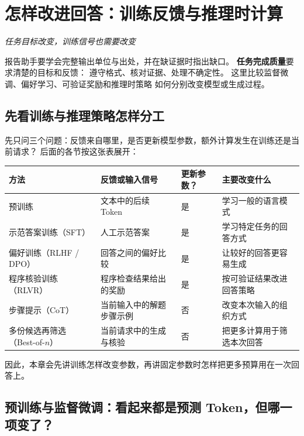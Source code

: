 \chapterrule
\section{怎样改进回答：训练反馈与推理时计算}
\label{intro:post-training}
\label{intro:test-time-compute}

\begin{idea}
\noindent\emph{任务目标改变，训练信号也需要改变}\par

报告助手要学会完整输出单位与出处，并在缺证据时指出缺口。
\textbf{任务完成质量}要求清楚的目标和反馈：
遵守格式、核对证据、处理不确定性。
这里比较监督微调、偏好学习、可验证奖励和推理时策略
如何分别改变模型或生成过程。
\end{idea}

\subsection{先看训练与推理策略怎样分工}
\label{sec:training-inference-roles}

先只问三个问题：反馈来自哪里，是否更新模型参数，额外计算发生在训练还是当前请求？
后面的各节按这张表展开：

\begin{center}
\small
\renewcommand{\arraystretch}{1.25}
\begin{tabularx}{\linewidth}{@{}p{29mm}p{36mm}p{19mm}X@{}}\toprule
方法 & 反馈或输入信号 & 更新参数？ & 主要改变什么\\\midrule
预训练 & 文本中的后续 Token & 是 & 学习一般的语言模式\\
示范答案训练（SFT） & 人工示范答案 & 是 & 学习特定任务的回答方式\\
偏好训练（RLHF / DPO） & 回答之间的偏好比较 & 是 & 让较好的回答更容易生成\\
程序核验训练（RLVR） & 程序检查结果给出的奖励 & 是 & 按可验证结果改进回答策略\\
步骤提示（CoT） & 当前输入中的解题步骤示例 & 否 & 改变本次输入的组织方式\\
多份候选再筛选（Best-of-$n$） & 当前请求中的生成与核验 & 否 & 把更多计算用于筛选本次回答\\
\bottomrule
\end{tabularx}
\end{center}

因此，本章会先讲训练怎样改变参数，再讲固定参数时怎样把更多预算用在一次回答上。

\subsection{预训练与监督微调：看起来都是预测 Token，但哪一项变了？}
\label{concept:sft}

